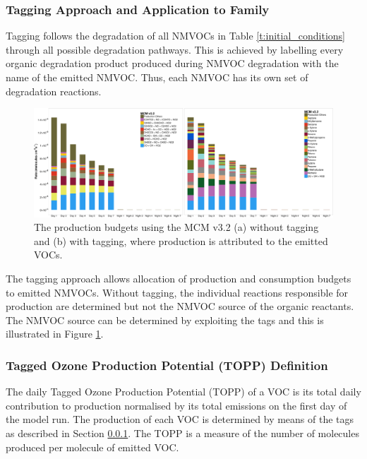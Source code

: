\subsubsection[Tagging Approach and Application to Ox Family]{Tagging Approach and Application to  Family} \label{ss:tagging} %

Tagging follows the degradation of all NMVOCs in Table \ref{t:initial_conditions} through all possible degradation pathways. 
This is achieved by labelling every organic degradation product produced during NMVOC degradation with the name of the emitted NMVOC. 
Thus, each NMVOC has its own set of degradation reactions. 

\begin{figure}
    \begin{center}
        \includegraphics[width=\textwidth]{img/MCMv3_2_Ox_production_budgets}
        \caption{The  production budgets using the MCM v3.2 (a) without tagging and (b) with tagging, where  production is attributed to the emitted VOCs.}
        \label{f:Ox_budget}
    \end{center}
\end{figure} 

The tagging approach allows allocation of production and consumption budgets to emitted NMVOCs. 
Without tagging, the individual reactions responsible for  production are determined but not the NMVOC source of the organic reactants. 
The NMVOC source can be determined by exploiting the tags and this is illustrated in Figure \ref{f:Ox_budget}.

\subsubsection{Tagged Ozone Production Potential (TOPP) Definition} %

The daily Tagged Ozone Production Potential (TOPP) of a VOC is its total daily contribution to  production normalised by its total emissions on the first day of the model run. 
The  production of each VOC is determined by means of the tags as described in Section \ref{ss:tagging}. 
The TOPP is a measure of the number of  molecules produced per molecule of emitted VOC.  
